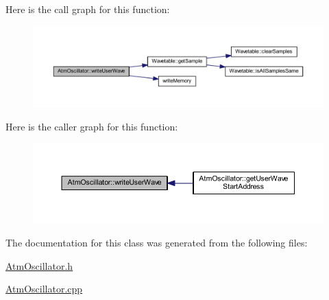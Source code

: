 Here is the call graph for this function\+:
\nopagebreak
\begin{figure}[H]
\begin{center}
\leavevmode
\includegraphics[width=350pt]{d8/d5f/class_atm_oscillator_a92133ff9c3b34a6acb703f0d6d95cd71_cgraph}
\end{center}
\end{figure}
Here is the caller graph for this function\+:
\nopagebreak
\begin{figure}[H]
\begin{center}
\leavevmode
\includegraphics[width=350pt]{d8/d5f/class_atm_oscillator_a92133ff9c3b34a6acb703f0d6d95cd71_icgraph}
\end{center}
\end{figure}


The documentation for this class was generated from the following files\+:\begin{DoxyCompactItemize}
\item 
\hyperlink{_atm_oscillator_8h}{Atm\+Oscillator.\+h}\item 
\hyperlink{_atm_oscillator_8cpp}{Atm\+Oscillator.\+cpp}\end{DoxyCompactItemize}
